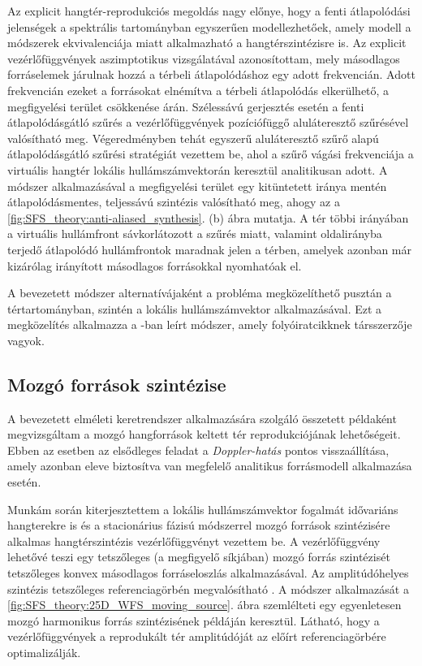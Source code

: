 \documentclass[10pt,twoside]{article}
\theoremstyle{thesisgroupstyle}
\theoremstyle{indented}
\begin{document}
Az explicit hangtér-reprodukciós megoldás nagy előnye, hogy a fenti átlapolódási jelenségek a spektrális tartományban egyszerűen modellezhetőek, amely modell a módszerek ekvivalenciája miatt alkalmazható a hangtérszintézisre is.
Az explicit vezérlőfüggvények aszimptotikus vizsgálatával azonosítottam, mely másodlagos forráselemek járulnak hozzá a térbeli átlapolódáshoz egy adott frekvencián.
Adott frekvencián ezeket a forrásokat elnémítva a térbeli átlapolódás elkerülhető, a megfigyelési terület csökkenése árán.
Szélessávú gerjesztés esetén a fenti átlapolódásgátló szűrés a vezérlőfüggvények pozíciófüggő aluláteresztő szűrésével valósítható meg.
Végeredményben tehát egyszerű aluláteresztő szűrő alapú átlapolódásgátló szűrési stratégiát vezettem be, ahol a szűrő vágási frekvenciája a virtuális hangtér lokális hullámszámvektorán keresztül analitikusan adott.
A módszer alkalmazásával a megfigyelési terület egy kitüntetett iránya mentén átlapolódásmentes, teljessávú szintézis valósítható meg, ahogy az a \ref{fig:SFS_theory:anti-aliased_synthesis}. (b) ábra mutatja.
A tér többi irányában a virtuális hullámfront sávkorlátozott a szűrés miatt, valamint oldalirányba terjedő átlapolódó hullámfrontok maradnak jelen a térben, amelyek azonban már kizárólag irányított másodlagos forrásokkal nyomhatóak el.

A bevezetett módszer alternatívájaként a probléma megközelíthető pusztán a tértartományban, szintén a lokális hullámszámvektor alkalmazásával.
Ezt a megközelítés alkalmazza a \cite{8611109_booklet}-ban leírt módszer, amely folyóiratcikknek társszerzője vagyok.

\subsection{Mozgó források szintézise}

A bevezetett elméleti keretrendszer alkalmazására szolgáló összetett példaként megvizsgáltam a mozgó hangforrások keltett tér reprodukciójának lehetőségeit.
Ebben az esetben az elsődleges feladat a \emph{Doppler-hatás} pontos visszaállítása, amely azonban eleve biztosítva van megfelelő analitikus forrásmodell alkalmazása esetén.

Munkám során kiterjesztettem a lokális hullámszámvektor fogalmát idővariáns hangterekre is és a stacionárius fázisú módszerrel mozgó források szintézisére alkalmas hangtérszintézis vezérlőfüggvényt vezettem be.
A vezérlőfüggvény lehetővé teszi egy tetszőleges (a megfigyelő síkjában) mozgó forrás szintézisét tetszőleges konvex másodlagos forráseloszlás alkalmazásával. 
Az amplitúdóhelyes szintézis tetszőleges referenciagörbén megvalósítható \cite{firtha2016wave_booklet, doi:10.1121/1.4996126_booklet, Firtha2015:daga_booklet}.
A módszer alkalmazását a \ref{fig:SFS_theory:25D_WFS_moving_source}. ábra szemlélteti egy egyenletesen mozgó harmonikus forrás szintézisének példáján keresztül.
Látható, hogy a vezérlőfüggvények a reprodukált tér amplitúdóját az előírt referenciagörbére optimalizálják. 
\end{document}

